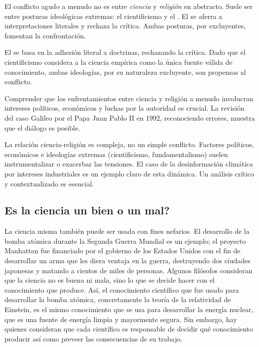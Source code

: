 El conflicto agudo a menudo no es entre \emph{ciencia} y \emph{religión} en abstracto.
Suele ser entre posturas ideológicas extremas: el cientificismo y el .
El  se aferra a interpretaciones literales y rechaza la crítica.
Ambas posturas, por excluyentes, fomentan la confrontación.

\begin{remember}
    El  se basa en la adhesión literal a doctrinas, rechazando la crítica.
    Dado que el cientificismo considera a la ciencia empírica como la única fuente válida de conocimiento, ambas ideologías, por su naturaleza excluyente, son propensas al conflicto.
\end{remember}

Comprender que los enfrentamientos entre ciencia y religión a menudo involucran intereses políticos, económicos y luchas por la autoridad es crucial.
La revisión del caso Galileo por el Papa Juan Pablo II en 1992, reconociendo errores, muestra que el diálogo es posible.

\begin{remember}
    La relación ciencia-religión es compleja, no un simple conflicto.
    Factores políticos, económicos e ideologías extremas (cientificismo, fundamentalismo) suelen instrumentalizar o exacerbar las tensiones.
    El caso de la desinformación climática por intereses industriales es un ejemplo claro de esta dinámica.
    Un análisis crítico y contextualizado es esencial.
\end{remember}



\subsection*{Es la ciencia un bien o un mal?}
\label{sub:eslacienciaunbienounmal}

La ciencia misma también puede ser usada con fines nefarios.
El desarrollo de la bomba atómica durante la Segunda Guerra Mundial es un
ejemplo; el proyecto Manhattan fue financiado por el gobierno de los Estados
Unidos con el fin de desarrollar un arma que les diera ventaja en la guerra,
destruyendo dos ciudades japonesas y matando a cientos de miles de personas.
Algunos filósofos consideran que la ciencia no es buena ni mala, sino lo que
se decide hacer con el conocimiento que produce.
Así, el conocimiento científico que fue usado para desarrollar la bomba atómica,
concretamente la teoría de la relatividad de Einstein, es el mismo conocimiento
que se usa para desarrollar la energía nuclear, que es una fuente de energía
limpia y mayormente segura.
Sin embargo, hay quienes consideran que cada científico es responsable de
decidir qué conocimiento producir así como preveer las consecuencias de su
trabajo.

